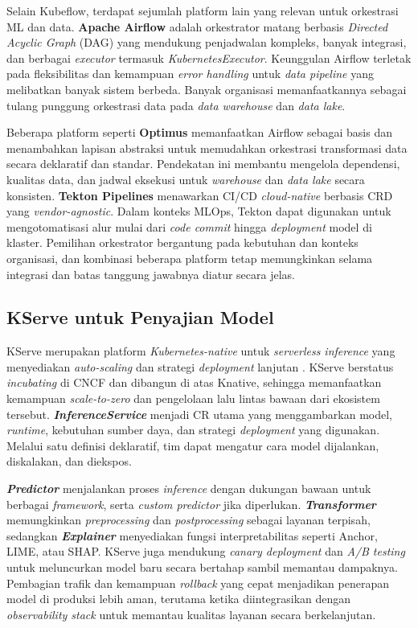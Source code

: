 Selain Kubeflow, terdapat sejumlah platform lain yang relevan untuk orkestrasi ML dan data. \textbf{Apache Airflow} adalah orkestrator matang berbasis \textit{Directed Acyclic Graph} (DAG) yang mendukung penjadwalan kompleks, banyak integrasi, dan berbagai \textit{executor} termasuk \textit{KubernetesExecutor}. Keunggulan Airflow terletak pada fleksibilitas dan kemampuan \textit{error handling} untuk \textit{data pipeline} yang melibatkan banyak sistem berbeda. Banyak organisasi memanfaatkannya sebagai tulang punggung orkestrasi data pada \textit{data warehouse} dan \textit{data lake}.

Beberapa platform seperti \textbf{Optimus} memanfaatkan Airflow sebagai basis dan menambahkan lapisan abstraksi untuk memudahkan orkestrasi transformasi data secara deklaratif dan standar. Pendekatan ini membantu mengelola dependensi, kualitas data, dan jadwal eksekusi untuk \textit{warehouse} dan \textit{data lake} secara konsisten. \textbf{Tekton Pipelines} menawarkan CI/CD \textit{cloud-native} berbasis CRD yang \textit{vendor-agnostic}. Dalam konteks MLOps, Tekton dapat digunakan untuk mengotomatisasi alur mulai dari \textit{code commit} hingga \textit{deployment} model di klaster. Pemilihan orkestrator bergantung pada kebutuhan dan konteks organisasi, dan kombinasi beberapa platform tetap memungkinkan selama integrasi dan batas tanggung jawabnya diatur secara jelas.

\subsection{KServe untuk Penyajian Model}
\label{sec:kserve}

KServe merupakan platform \textit{Kubernetes-native} untuk \textit{serverless inference} yang menyediakan \textit{auto-scaling} dan strategi \textit{deployment} lanjutan \autocite{kserve2024}. KServe berstatus \textit{incubating} di CNCF dan dibangun di atas Knative, sehingga memanfaatkan kemampuan \textit{scale-to-zero} dan pengelolaan lalu lintas bawaan dari ekosistem tersebut. \textbf{\textit{InferenceService}} menjadi CR utama yang menggambarkan model, \textit{runtime}, kebutuhan sumber daya, dan strategi \textit{deployment} yang digunakan. Melalui satu definisi deklaratif, tim dapat mengatur cara model dijalankan, diskalakan, dan diekspos.

\textbf{\textit{Predictor}} menjalankan proses \textit{inference} dengan dukungan bawaan untuk berbagai \textit{framework}, serta \textit{custom predictor} jika diperlukan. \textbf{\textit{Transformer}} memungkinkan \textit{preprocessing} dan \textit{postprocessing} sebagai layanan terpisah, sedangkan \textbf{\textit{Explainer}} menyediakan fungsi interpretabilitas seperti Anchor, LIME, atau SHAP. KServe juga mendukung \textit{canary deployment} dan \textit{A/B testing} untuk meluncurkan model baru secara bertahap sambil memantau dampaknya. Pembagian trafik dan kemampuan \textit{rollback} yang cepat menjadikan penerapan model di produksi lebih aman, terutama ketika diintegrasikan dengan \textit{observability stack} untuk memantau kualitas layanan secara berkelanjutan.

